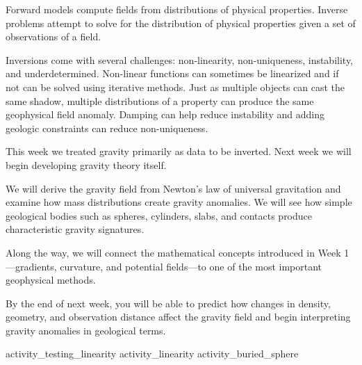 
Forward models compute fields from distributions of physical properties.  Inverse problems attempt to solve for the distribution of physical properties given a set of observations of a field.

Inversions come with several challenges: non-linearity, non-uniqueness, instability, and underdetermined.  Non-linear functions can sometimes be linearized and if not can be solved using iterative methods.  Just as multiple objects can cast the same shadow, multiple distributions of a property can produce the same geophysical field anomaly.  Damping can help reduce instability and adding geologic constraints can reduce non-uniqueness.


This week we treated gravity primarily as data to be inverted. Next week we will begin developing gravity theory itself.

We will derive the gravity field from Newton's law of universal gravitation and examine how mass distributions create gravity anomalies. We will see how simple geological bodies such as spheres, cylinders, slabs, and contacts produce characteristic gravity signatures.

Along the way, we will connect the mathematical concepts introduced in Week 1—gradients, curvature, and potential fields—to one of the most important geophysical methods.

By the end of next week, you will be able to predict how changes in density, geometry, and observation distance affect the gravity field and begin interpreting gravity anomalies in geological terms.


\workshopend
\notepage
\notepage

{activity_testing_linearity}
{activity_linearity}
{activity_buried_sphere}

